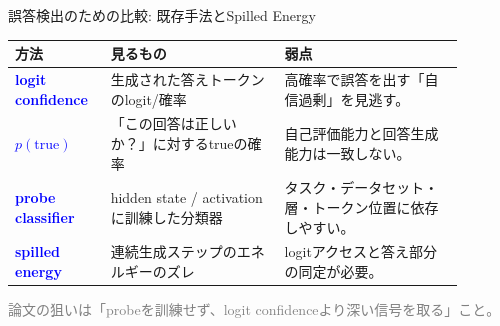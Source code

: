\documentclass[dvipdfmx,uplatex,unicode,9pt,aspectratio=169]{beamer}
\newcommand{\notegray}[1]{\textcolor{GrayText}{\footnotesize #1}}
\newcommand{\metric}[1]{\textbf{\textcolor{Blue}{#1}}}
\begin{document}
\begin{frame}{誤答検出のための比較: 既存手法とSpilled Energy}
\begin{center}
\renewcommand{\arraystretch}{1.25}
\begin{tabular}{p{0.18\linewidth}p{0.35\linewidth}p{0.36\linewidth}}
\toprule
\textbf{方法} & \textbf{見るもの} & \textbf{弱点}\\
\midrule
\metric{logit confidence} & 生成された答えトークンのlogit/確率 & 高確率で誤答を出す「自信過剰」を見逃す。\\
\metric{$p(\mathrm{true})$} & 「この回答は正しいか？」に対するtrueの確率 & 自己評価能力と回答生成能力は一致しない。\\
\metric{probe classifier} & hidden state / activationに訓練した分類器 & タスク・データセット・層・トークン位置に依存しやすい。\\
\metric{spilled energy} & 連続生成ステップのエネルギーのズレ & logitアクセスと答え部分の同定が必要。\\
\bottomrule
\end{tabular}
\end{center}
\vspace{0.4em}
\notegray{論文の狙いは「probeを訓練せず、logit confidenceより深い信号を取る」こと。}
\end{frame}
\end{document}
